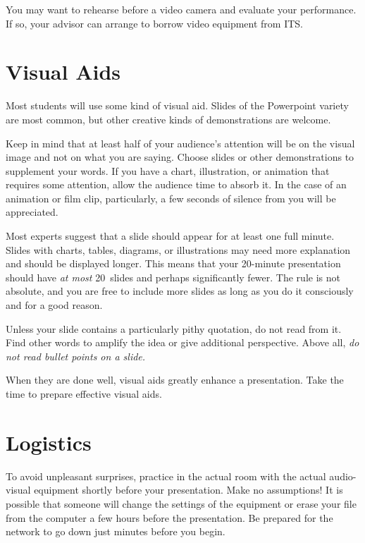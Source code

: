 \documentclass[finalcopy]{srpaper}
\begin{document}
You may want to rehearse before a video camera and evaluate
your performance.
If so, your advisor can arrange to
borrow video equipment from ITS.%


\section{Visual Aids}
Most students will use some kind of visual aid. Slides of
the Powerpoint variety are most common, but other creative
kinds of demonstrations are welcome.

Keep in mind that at least half of your audience's attention
will be on the visual image and not on what you are
saying. Choose slides or other demonstrations to supplement
your words. If you have a chart, illustration, or animation
that requires some attention, allow the audience time to
absorb it. In the case of an animation or film clip,
particularly, a few seconds of silence from you will be
appreciated.

Most experts suggest that a slide should appear for at least
one full minute. Slides with charts, tables, diagrams, or
illustrations may need more explanation and should be
displayed longer. This means that your 20-minute
presentation should have \emph{at most} 20~slides and
perhaps significantly fewer. The rule is not absolute, and
you are free to include more slides as long as you do it
consciously and for a good reason.

Unless your slide contains a particularly pithy quotation,
do not read from it. Find other words to amplify the idea or
give additional perspective. Above all, \emph{do not read
  bullet points on a slide.}

When they are done well, visual aids greatly enhance a
presentation. Take the time to prepare effective visual
aids.


\section{Logistics}
To avoid unpleasant surprises, practice in the actual room
with the actual audio-visual equipment shortly before your
presentation. Make no assumptions! It is possible that
someone will change the settings of the equipment or erase
your file from the computer a few hours before the
presentation. Be prepared for the network to go down just
minutes before you begin.
\end{document}
